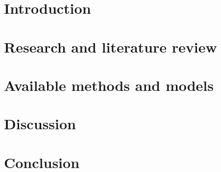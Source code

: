
\chapter{Introduction}
\label{chapter:introduction}


\chapter{Research and literature review}
\label{chapter:research}


\chapter{Available methods and models}
\label{chapter:methods}

\chapter{Discussion}
\label{chapter:discussion}


\chapter{Conclusion}
\label{chapter:conclusion}


